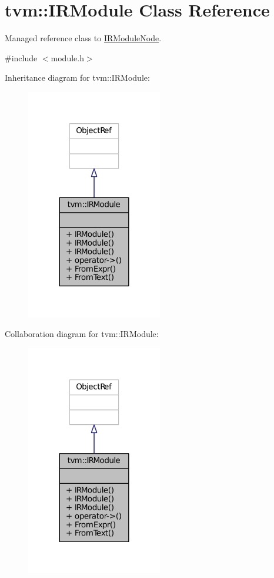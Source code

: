 \hypertarget{classtvm_1_1IRModule}{}\section{tvm\+:\+:I\+R\+Module Class Reference}
\label{classtvm_1_1IRModule}


Managed reference class to \hyperlink{classtvm_1_1IRModuleNode}{I\+R\+Module\+Node}.  




{\ttfamily \#include $<$module.\+h$>$}



Inheritance diagram for tvm\+:\+:I\+R\+Module\+:
\nopagebreak
\begin{figure}[H]
\begin{center}
\leavevmode
\includegraphics[width=168pt]{classtvm_1_1IRModule__inherit__graph}
\end{center}
\end{figure}


Collaboration diagram for tvm\+:\+:I\+R\+Module\+:
\nopagebreak
\begin{figure}[H]
\begin{center}
\leavevmode
\includegraphics[width=168pt]{classtvm_1_1IRModule__coll__graph}
\end{center}
\end{figure}
